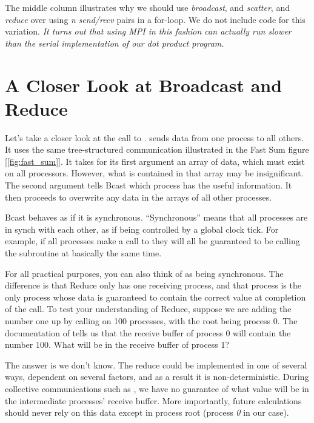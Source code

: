 The middle column illustrates why we should use \emph{broadcast}, and \emph{scatter}, and \emph{reduce} over using \emph{n} \emph{send/recv} pairs in a for-loop. We do not include code for this variation. \emph{It turns out that using MPI in this fashion can actually run slower than the serial implementation of our dot product program.}



\section*{A Closer Look at Broadcast and Reduce}
Let's take a closer look at the call to .  sends data from one process to all others. It uses the same tree-structured communication illustrated in the Fast Sum figure [\ref{fig:fast_sum}]. It takes for its first argument an array of data, which must exist on all processors. However, what is contained in that array may be insignificant. The second argument tells Bcast which process has the useful information. It then proceeds to overwrite any data in the arrays of all other processes.

Bcast behaves as if it is synchronous. ``Synchronous'' means that all processes are in synch with each other, as if being controlled by a global clock tick. For example, if all processes make a call to  they will all be guaranteed to be calling the subroutine at basically the same time.

For all practical purposes, you can also think of  as being synchronous. The difference is that Reduce only has one receiving process, and that process is the only process whose data is guaranteed to contain the correct value at completion of the call. To test your understanding of Reduce, suppose we are adding the number one up by calling  on 100 processes, with the root being process 0. The documentation of  tells us that the receive buffer of process 0 will contain the number 100. What will be in the receive buffer of process 1?

The answer is we don't know. The reduce could be implemented in one of several ways, dependent on several factors, and as a result it is non-deterministic. During collective communications such as , we have no guarantee of what value will be in the intermediate processes' receive buffer. More importantly, future calculations should never rely on this data except in process root (process \emph{0} in our case).


